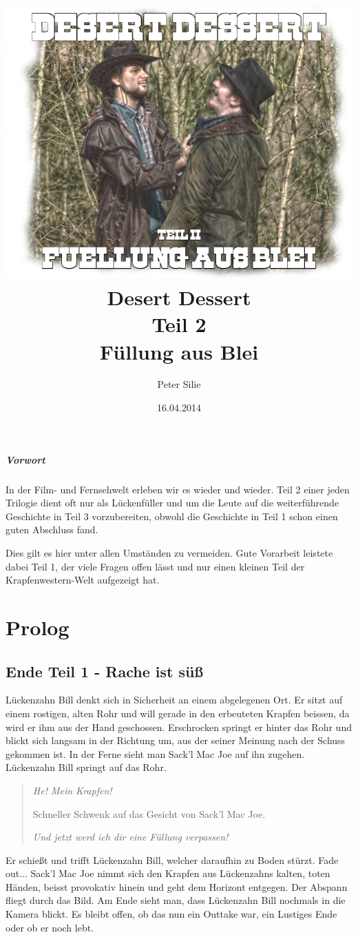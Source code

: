 \documentclass[10pt,a4paper,german]{book}
\author{Peter Silie}
\title{	\includegraphics[scale=0.5]{titelbild.png}\\
		\vspace{1cm}
		Desert Dessert\\
		Teil 2\\
		Füllung aus Blei
		}
\date{16.04.2014}
\begin{document}
\maketitle
\tableofcontents
\newpage
\paragraph{Vorwort}
In der Film- und Fernsehwelt erleben wir es wieder und wieder. Teil 2 einer jeden Trilogie dient oft nur als Lückenfüller und um die Leute auf die weiterführende Geschichte in Teil 3 vorzubereiten, obwohl die Geschichte in Teil 1 schon einen guten Abschluss fand.

Dies gilt es hier unter allen Umständen zu vermeiden. Gute Vorarbeit leistete dabei Teil 1, der viele Fragen offen lässt und nur einen kleinen Teil der Krapfenwestern-Welt aufgezeigt hat.
\chapter{Prolog}
\section{Ende Teil 1 - Rache ist süß}
Lückenzahn Bill denkt sich in Sicherheit an einem abgelegenen Ort. Er sitzt auf einem rostigen, alten Rohr und will gerade in den erbeuteten Krapfen beissen, da wird er ihm aus der Hand geschossen. Erschrocken springt er hinter das Rohr und blickt sich langsam in der Richtung um, aus der seiner Meinung nach der Schuss gekommen ist. In der Ferne sieht man Sack'l Mac Joe auf ihn zugehen. Lückenzahn Bill springt auf das Rohr.

\begin{verse}
\textit{\glqq He! Mein Krapfen!\grqq}

Schneller Schwenk auf das Gesicht von Sack'l Mac Joe.

\textit{\glqq Und jetzt werd ich dir eine Füllung verpassen!\grqq}\\
\end{verse}

Er schießt und trifft Lückenzahn Bill, welcher daraufhin zu Boden stürzt. Fade out...
Sack'l Mac Joe nimmt sich den Krapfen aus Lückenzahns kalten, toten Händen, beisst provokativ hinein und geht dem Horizont entgegen.
Der Abspann fliegt durch das Bild.
Am Ende sieht man, dass Lückenzahn Bill nochmals in die Kamera blickt. Es bleibt offen, ob das nun ein Outtake war, ein Lustiges Ende oder ob er noch lebt.

%
\end{document}
